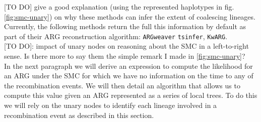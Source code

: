 \documentclass{article}
\newcommand{\tsinfer}[0]{\texttt{tsinfer}}
\newcommand{\kwarg}[0]{\texttt{KwARG}}
\newcommand{\argweaver}[0]{\texttt{ARGweaver}}
\begin{document}
[TO DO] give a good explanation (using the represented haplotypes 
in fig. \ref{fig:smc-unary}) on why these methods can infer the extent 
of coalescing lineages.
Currently, the following methods 
return the full this information by default as part of their ARG reconstruction algorithm: 
\argweaver \citep{rasmussen_genome-wide_2014} 
\tsinfer \citep{kelleher_inferring_2019}, 
\kwarg \citep{ignatieva_kwarg_2021}.\\


[TO DO]: impact of unary nodes on reasoning about the SMC in a left-to-right sense.
Is there more to say them the simple remark I made in \ref{fig:smc-unary}?\\

In the next paragraph we will derive an expression to compute the 
likelihood for an ARG under the SMC for which we have no information on the 
time to any of the recombination events. We will then detail an algorithm 
that allows us to compute this value given an ARG 
represented as a series of local trees. To do this we will rely on the unary nodes 
to identify each lineage involved in a recombination event 
as described in this section.
\end{document}
